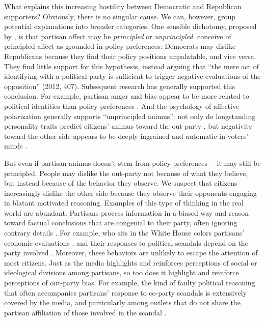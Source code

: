 \documentclass[12pt, letterpaper]{article}
\begin{document}
What explains this increasing hostility between Democratic and Republican supporters? Obviously, there is no singular cause. We can, however, group potential explanations into broader categories. One sensible dichotomy, proposed by \citet{IyengarSoodLelkes2012}, is that partisan affect may be \emph{principled} or \emph{unprincipled}. \citeauthor{IyengarSoodLelkes2012} conceive of principled affect as grounded in policy preferences: Democrats may dislike Republicans because they find their policy positions unpalatable, and vice versa. They find little support for this hypothesis, instead arguing that ``the mere act of identifying with a political party is sufficient to trigger negative evaluations of the opposition'' (2012, 407). Subsequent research has generally supported this conclusion. For example, partisan anger and bias appear to be more related to political identities than policy preferences \citep{mason_2015}. And the psychology of affective polarization generally supports ``unprincipled animus'': not only do longstanding personality traits predict citizens' animus toward the out-party \citep{webster2018personal}, but negativity toward the other side appears to be deeply ingrained and automatic in voters' minds \citep{IyengarWestwood2014}.

But even if partisan animus doesn't stem from policy preferences \citep[e.g.,][]{rogowski2016how}---it may still be principled. People may dislike the out-party not because of what they believe, but instead because of the behavior they observe. We suspect that citizens increasingly dislike the other side because they observe their opponents engaging in blatant motivated reasoning. Examples of this type of thinking in the real world are abundant. Partisans process information in a biased way and reason toward factual conclusions that are congenial to their party, often ignoring contrary details \citep{lodgetaber_2013}. For example, who sits in the White House colors partisans' economic evaluations \citep{bartels_2002,bisgaard2015bias}, and their responses to political scandals depend on the party involved \citep{ahlersood_2014}. Moreover, these behaviors are unlikely to escape the attention of most citizens. Just as the media highlights and reinforces perceptions of social or ideological divisions among partisans, so too does it highlight and reinforce perceptions of out-party bias. For example, the kind of faulty political reasoning that often accompanies partisans' response to co-party scandals is extensively covered by the media, and particularly among outlets that do not share the partisan affiliation of those involved in the scandal \citep{budaketal_2016,puglisisnyder_2011}. 
\end{document}
